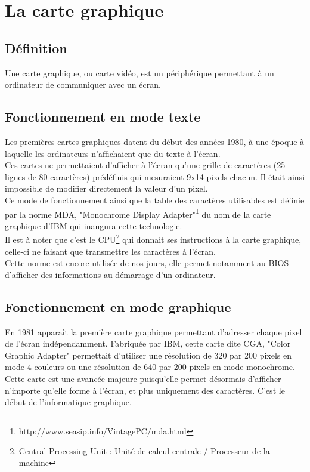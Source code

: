 \section{La carte graphique}
\subsection{Définition}
Une carte graphique, ou carte vidéo, est un périphérique permettant à un ordinateur de communiquer 
avec un écran.\\
\subsection{Fonctionnement en mode texte}
Les premières cartes graphiques datent du début des années 1980, à une époque à laquelle les ordinateurs n'affichaient que du texte à l'écran.\\
Ces cartes ne permettaient d'afficher à l'écran qu'une grille de caractères 
(25 lignes de 80 caractères) prédéfinis qui mesuraient 9x14 pixels chacun. Il était ainsi impossible de modifier directement la valeur d'un pixel.\\
Ce mode de fonctionnement ainsi que la table des caractères utilisables est 
définie par la norme MDA, "Monochrome Display Adapter"\footnote{http://www.seasip.info/VintagePC/mda.html}
du nom de la carte graphique d'IBM qui inaugura cette technologie.\\
Il est à noter que c'est le CPU\footnote{Central Processing Unit : Unité de calcul centrale / Processeur de la machine} qui donnait ses instructions à la carte graphique, celle-ci ne faisant que transmettre les caractères à l'écran.\\
Cette norme est encore utilisée de nos jours, elle permet notamment au BIOS d'afficher des informations au démarrage d'un ordinateur.
\newpage
\subsection{Fonctionnement en mode graphique}

En 1981 apparaît la première carte graphique permettant d'adresser chaque pixel de l'écran indépendamment.
Fabriquée par IBM, cette carte dite CGA, "Color Graphic Adapter" permettait d'utiliser une résolution de 320 par 200 pixels en mode 4 couleurs ou une résolution de 640 par 200 pixels en mode monochrome.\\
Cette carte est une avancée majeure puisqu'elle permet désormais d'afficher n'importe qu'elle forme à l'écran, et plus uniquement des caractères. C'est le début de l'informatique graphique.

